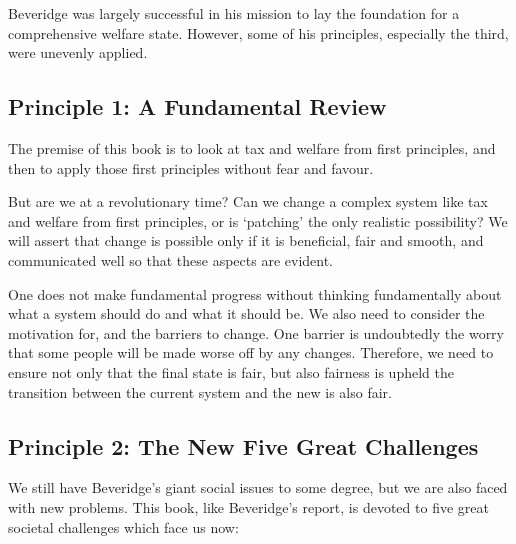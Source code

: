 \documentclass[]{tufte-handout}
\begin{document}
Beveridge was largely successful in his mission to lay the foundation
for a comprehensive welfare state. However, some of his principles,
especially the third, were unevenly applied.

\hypertarget{principle-1-a-fundamental-review}{%
\subsection{\texorpdfstring{\textbf{Principle 1: A Fundamental
Review}}{Principle 1: A Fundamental Review}}\label{principle-1-a-fundamental-review}}

The premise of this book is to look at tax and welfare from first
principles, and then to apply those first principles without fear and
favour.

But are we at a revolutionary time? Can we change a complex system like
tax and welfare from first principles, or is `patching' the only
realistic possibility? We will assert that change is possible only if it
is beneficial, fair and smooth, and communicated well so that these
aspects are evident.

One does not make fundamental progress without thinking fundamentally
about what a system should do and what it should be. We also need to
consider the motivation for, and the barriers to change. One barrier is
undoubtedly the worry that some people will be made worse off by any
changes. Therefore, we need to ensure not only that the final state is
fair, but also fairness is upheld the transition between the current
system and the new is also fair.

\hypertarget{principle-2-the-new-five-great-challenges}{%
\subsection{\texorpdfstring{\textbf{Principle 2: The New Five Great
Challenges}}{Principle 2: The New Five Great Challenges}}\label{principle-2-the-new-five-great-challenges}}

We still have Beveridge's giant social issues to some degree, but we are
also faced with new problems. This book, like Beveridge's report, is
devoted to five great societal challenges which face us now:
\end{document}
